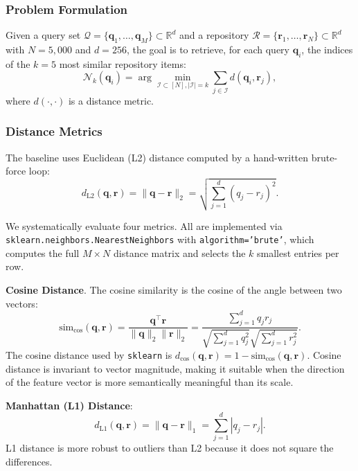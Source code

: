 \documentclass[onecolumn,a4paper,12pt]{IEEEtran}
\begin{document}
\subsubsection{Problem Formulation}

Given a query set $\mathcal{Q} = \{\mathbf{q}_1, \dots, \mathbf{q}_M\} \subset \mathbb{R}^d$ and a repository $\mathcal{R} = \{\mathbf{r}_1, \dots, \mathbf{r}_N\} \subset \mathbb{R}^d$ with $N=5{,}000$ and $d=256$, the goal is to retrieve, for each query $\mathbf{q}_i$, the indices of the $k=5$ most similar repository items:
\begin{equation}
\mathcal{N}_k(\mathbf{q}_i) = \arg\min_{\mathcal{I} \subset [N], |\mathcal{I}|=k} \sum_{j \in \mathcal{I}} d(\mathbf{q}_i, \mathbf{r}_j),
\end{equation}
where $d(\cdot, \cdot)$ is a distance metric.

\subsubsection{Distance Metrics}

The baseline uses Euclidean (L2) distance computed by a hand-written brute-force loop:
\begin{equation}
d_{\text{L2}}(\mathbf{q}, \mathbf{r}) = \|\mathbf{q} - \mathbf{r}\|_2 = \sqrt{\sum_{j=1}^{d} (q_j - r_j)^2}.
\end{equation}

We systematically evaluate four metrics. All are implemented via \texttt{sklearn.neighbors.NearestNeighbors} with \texttt{algorithm='brute'}, which computes the full $M \times N$ distance matrix and selects the $k$ smallest entries per row.

\textbf{Cosine Distance}. The cosine similarity is the cosine of the angle between two vectors:
\begin{equation}
\text{sim}_{\cos}(\mathbf{q}, \mathbf{r}) = \frac{\mathbf{q}^{\top} \mathbf{r}}{\|\mathbf{q}\|_2 \|\mathbf{r}\|_2} = \frac{\sum_{j=1}^{d} q_j r_j}{\sqrt{\sum_{j=1}^{d} q_j^2} \sqrt{\sum_{j=1}^{d} r_j^2}}.
\end{equation}
The cosine distance used by \texttt{sklearn} is $d_{\cos}(\mathbf{q}, \mathbf{r}) = 1 - \text{sim}_{\cos}(\mathbf{q}, \mathbf{r})$. Cosine distance is invariant to vector magnitude, making it suitable when the direction of the feature vector is more semantically meaningful than its scale.

\textbf{Manhattan (L1) Distance}:
\begin{equation}
d_{\text{L1}}(\mathbf{q}, \mathbf{r}) = \|\mathbf{q} - \mathbf{r}\|_1 = \sum_{j=1}^{d} |q_j - r_j|.
\end{equation}
L1 distance is more robust to outliers than L2 because it does not square the differences.
\end{document}
